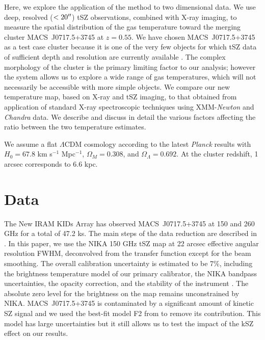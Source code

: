 \documentclass[twocolumn,traditabstract]{aa}
\begin{document}
Here, we explore the application of the method to two dimensional data. We use deep, resolved ($< 20\hbox{$^{\prime\prime}$}$) tSZ observations, combined with X-ray imaging, to measure the spatial distribution of the gas temperature toward the merging cluster \mbox{MACS~J0717.5+3745} at $z=0.55$. We have chosen \mbox{MACS~J0717.5+3745} as a test case cluster because it is one of the very few objects for which tSZ data of sufficient depth and resolution are currently available \citep{Adam2016b}. The complex morphology of the cluster is the primary limiting factor to our analysis; however the system allows us to explore a wide range of gas temperatures, which will not necessarily be accessible with more simple objects. We compare our new temperature map, based on X-ray and tSZ imaging, to that obtained from application of standard X-ray spectroscopic techniques using XMM-\textit{Newton} and \textit{Chandra} data. We describe and discuss in detail the various factors affecting the ratio between the two temperature estimates.

We assume a flat $\Lambda$CDM cosmology according to the latest {\it Planck} results \citep{Planck2015XIII} with $H_0 = 67.8$ km s$^{-1}$ Mpc$^{-1}$, $\Omega_M = 0.308$, and $\Omega_{\Lambda} = 0.692$. At the cluster redshift, 1 arcsec corresponds to 6.6 kpc.

\section{Data}\label{sec:data}
The New IRAM KIDs Array \citep[NIKA, see][]{Monfardini2011,Calvo2013,Adam2014,Catalano2014} has observed \mbox{MACS~J0717.5+3745} at 150 and 260 GHz for a total of 47.2 ks. The main steps of the data reduction are described in \cite{Adam2015,Adam2016a,Adam2016b,Ruppin2016}. In this paper, we use the NIKA 150 GHz tSZ map at 22 arcsec effective angular resolution FWHM, deconvolved from the transfer function except for the beam smoothing. The overall calibration uncertainty is estimated to be 7\%, including the brightness temperature model of our primary calibrator, the NIKA bandpass uncertainties, the opacity correction, and the stability of the instrument \citep{Catalano2014}. The absolute zero level for the brightness on the map remains unconstrained by NIKA. \mbox{MACS~J0717.5+3745} is contaminated by a significant amount of kinetic SZ \citep[kSZ,][]{Sunyaev1980} signal and we used the best-fit model F2 from \cite{Adam2016b} to remove its contribution. This model has large uncertainties but it still allows us to test the impact of the kSZ effect on our results.
\end{document}
